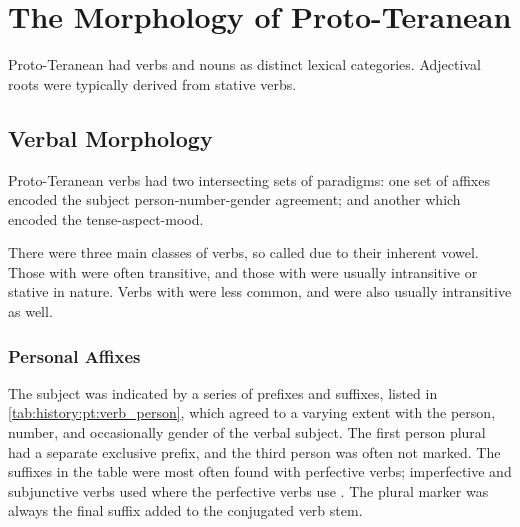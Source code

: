 \documentclass[grammar]{subfiles}
\begin{document}
\section{The Morphology of Proto-Teranean}
\label{sec:history:proto_teranean:morphology}

Proto-Teranean had verbs and nouns as distinct lexical categories.  Adjectival
roots were typically derived from stative verbs.


\subsection{Verbal Morphology}
\label{ssec:history:pt:verbal_morphology}

Proto-Teranean verbs had two intersecting sets of paradigms: one set of affixes
encoded the subject person-number-gender agreement; and another which encoded
the tense-aspect-mood.  

There were three main classes of verbs, so called due to their inherent vowel.
Those with  were often transitive, and those with  were
usually intransitive or stative in nature.  Verbs with  were less
common, and were also usually intransitive as well.


\subsubsection{Personal Affixes}
\label{sssec:history:pt:vm:subject_agreement}

The subject was indicated by a series of prefixes and suffixes, listed in
\cref{tab:history:pt:verb_person}, which agreed to a varying extent with the
person, number, and occasionally gender of the verbal subject.  The first
person plural had a separate exclusive prefix, and the third person was often
not marked.  The suffixes in the table were most often found with perfective
verbs; imperfective and subjunctive verbs used  where the
perfective verbs use .  The plural marker  was always
the final suffix added to the conjugated verb stem.
\end{document}
